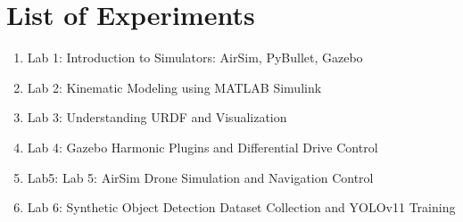 \section*{List of Experiments}
\begin{enumerate}
	\item Lab 1: Introduction to Simulators: AirSim, PyBullet, Gazebo
	\item Lab 2: Kinematic Modeling using MATLAB Simulink
	\item Lab 3: Understanding URDF and Visualization
	\item Lab 4: Gazebo Harmonic Plugins and Differential Drive Control
	\item Lab5: Lab 5: AirSim Drone Simulation and Navigation Control
	\item Lab 6: Synthetic Object Detection Dataset Collection and YOLOv11 Training

\end{enumerate}

\clearpage